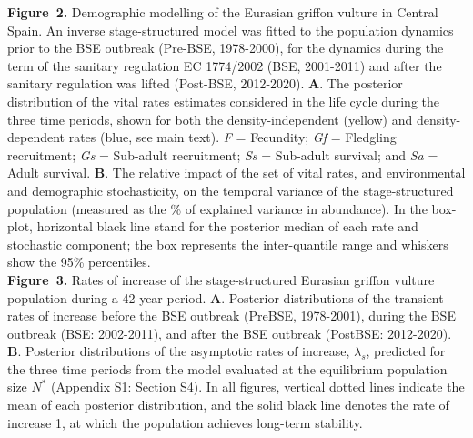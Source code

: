 \documentclass[12pt]{article}
\begin{document}
\noindent \textbf{Figure~2.} Demographic modelling of the Eurasian griffon vulture in Central Spain. An inverse stage-structured model was fitted to the population dynamics prior to the BSE outbreak (Pre-BSE, 1978-2000), for the dynamics during the term of the sanitary regulation EC 1774/2002 (BSE, 2001-2011) and after the sanitary regulation was lifted (Post-BSE, 2012-2020). \textbf{A}. The posterior distribution of the vital rates estimates considered in the life cycle during the three time periods, shown for both the density-independent (yellow) and density-dependent rates (blue, see main text). \textit{F} = Fecundity; \textit{Gf} = Fledgling recruitment; \textit{Gs} = Sub-adult recruitment; \textit{Ss} = Sub-adult survival; and \textit{Sa} = Adult survival. \textbf{B}. The relative impact of the set of vital rates, and environmental and demographic stochasticity, on the temporal variance of the stage-structured population (measured as the \% of explained variance in abundance). In the box-plot, horizontal black line stand for the posterior median of each rate and stochastic component; the box represents the inter-quantile range and whiskers show the 95\% percentiles.  \\

\noindent \textbf{Figure~3.} Rates of increase of the stage-structured Eurasian griffon vulture population during a 42-year period. \textbf{A}. Posterior distributions of the transient rates of increase before the BSE outbreak (PreBSE, 1978-2001), during the BSE outbreak (BSE: 2002-2011), and after the BSE outbreak (PostBSE: 2012-2020). \textbf{B}. Posterior distributions of the asymptotic rates of increase, $\lambda_{s}$, predicted for the three time periods from the model evaluated at the equilibrium population size $N^*$ (Appendix S1: Section S4). In all figures, vertical dotted lines indicate the mean of each posterior distribution, and the solid black line denotes the rate of increase 1, at which the population achieves long-term stability.\\
\end{document}
